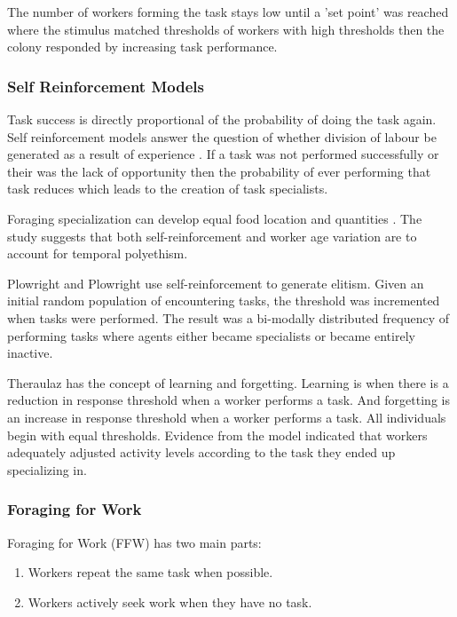 The number of workers forming the task stays low until a 'set point' was reached where the stimulus matched thresholds of workers with high thresholds then the colony responded by increasing task performance.

\subsubsection{Self Reinforcement Models}
Task success is directly proportional of the probability of doing the task again. Self reinforcement models answer the question of whether division of labour be generated as a result of experience \cite{lerman2005review}. If a task was not performed successfully or their was the lack of opportunity then the probability of ever performing that task reduces which leads to the creation of task specialists. 

Foraging specialization can develop equal food location and quantities \cite{deneubourg1987self}.
The study suggests that both self-reinforcement and worker age variation are to account for temporal polyethism. 

Plowright and Plowright \cite{plowright1988elitism} use self-reinforcement to generate elitism. Given an initial random population of encountering tasks, the threshold was incremented when tasks were performed. The result was a bi-modally distributed frequency of performing tasks where agents either became specialists or became entirely inactive.

Theraulaz \cite{theraulaz1998response} has the concept of learning and forgetting. Learning is when there is a reduction in response threshold when a worker performs a task. And forgetting is an increase in response threshold when a worker performs a task. All individuals begin with equal thresholds. Evidence from the model indicated that workers adequately adjusted activity levels according to the task they ended up specializing in. %

\subsubsection{Foraging for Work}
Foraging for Work (FFW) has two main parts:
\begin{enumerate}
	\item Workers repeat the same task when possible.
	\item Workers actively seek work when they have no task.
\end{enumerate}

